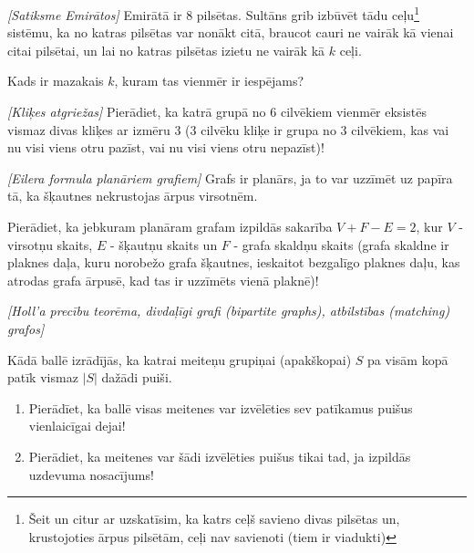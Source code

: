 

%



\noindent 


\begin{problem}
\textit{[Satiksme Emirātos]}
Emirātā ir $8$ pilsētas. Sultāns grib izbūvēt tādu ceļu\footnote{Šeit un citur ar uzskatīsim, ka katrs ceļš savieno divas pilsētas un, krustojoties ārpus pilsētām, ceļi nav savienoti (tiem ir viadukti)} sistēmu, ka no katras pilsētas var nonākt citā, braucot cauri ne vairāk kā vienai citai pilsētai, un lai no katras pilsētas izietu ne vairāk kā $k$ ceļi. 

Kads ir mazakais $k$, kuram tas vienmēr ir iespējams?

\end{problem}
%

\begin{problem}
\textit{[Kliķes atgriežas]}
Pierādiet, ka katrā grupā no $6$ cilvēkiem vienmēr eksistēs vismaz divas kliķes ar izmēru $3$ ($3$ cilvēku kliķe ir grupa no $3$ cilvēkiem, kas vai nu visi viens otru pazīst, vai nu visi viens otru nepazīst)!
\end{problem}
%

\begin{problem}
\textit{[Eilera formula planāriem grafiem]}
Grafs ir planārs, ja to var uzzīmēt uz papīra tā, ka šķautnes nekrustojas ārpus virsotnēm. 

Pierādiet, ka jebkuram planāram grafam izpildās sakarība $V+F-E=2$, kur $V$ - virsotņu skaits, $E$ - šķautņu skaits un $F$ - grafa skaldņu skaits (grafa skaldne ir plaknes daļa, kuru norobežo grafa šķautnes, ieskaitot bezgalīgo plaknes daļu, kas atrodas grafa ārpusē, kad tas ir uzzīmēts vienā plaknē)!
\end{problem}

\begin{problem}
\textit{[Holl'a precību teorēma, divdaļīgi grafi (bipartite graphs), atbilstības (matching) grafos]}

Kādā ballē izrādījās, ka katrai meiteņu grupiņai (apakškopai) $S$ pa visām kopā patīk vismaz $|S|$ dažādi puiši. 
\begin {enumerate}
\item Pierādīet, ka ballē visas meitenes var izvēlēties sev patīkamus puišus vienlaicīgai dejai!

\item Pierādiet, ka meitenes var šādi izvēlēties puišus tikai tad, ja izpildās uzdevuma nosacījums!
\end {enumerate}
\end{problem}

